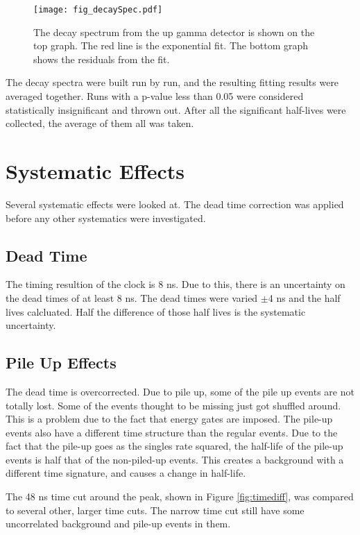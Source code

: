 \begin{figure}[!htb]
\centerline{\texttt{[image: fig\_decaySpec.pdf]}}
\caption{The decay spectrum from the up gamma detector is shown on the top graph.
	The red line is the exponential fit. 
	The bottom graph shows the residuals from the fit. 
	}
\label{fig:60secdecay}
\end{figure}


The decay spectra were built run by run, and the resulting fitting results were averaged together. 
Runs with a p-value less than 0.05 were considered statistically insignificant and thrown out.
After all the significant half-lives were collected, the average of them all was taken.

\section{Systematic Effects}
Several systematic effects were looked at.
The dead time correction was applied before any other systematics were investigated. 

\subsection{Dead Time}
The timing resultion of the clock is 8 ns.
Due to this, there is an uncertainty on the dead times of at least 8 ns.
The dead times were varied $\pm$4 ns and the half lives calcluated.
Half the difference of those half lives is the systematic uncertainty.

\subsection{Pile Up Effects}
The dead time is overcorrected. 
Due to pile up, some of the pile up events are not totally lost.
Some of the events thought to be missing just got shuffled around.
This is a problem due to the fact that energy gates are imposed.
The pile-up events also have a different time structure than the regular events.
Due to the fact that the pile-up goes as the singles rate squared, the half-life of the pile-up events is half that of the non-piled-up events.
This creates a background with a different time signature, and causes a change in half-life.

The 48 ns time cut around the peak, shown in Figure \ref{fig:timediff}, was compared to several other, larger time cuts.
The narrow time cut still have some uncorrelated background and pile-up events in them.


